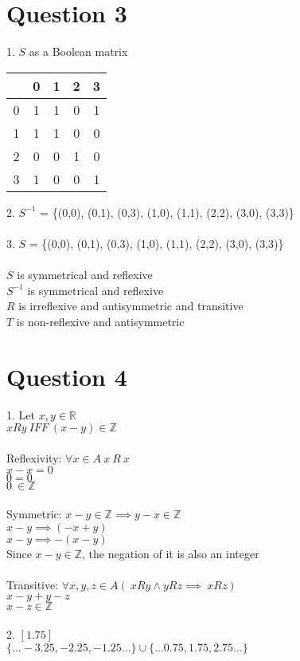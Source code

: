 \documentclass{article}
\begin{document}
    \section*{Question 3}
1. $S$ as a Boolean matrix \\
\begin{center}
\begin{tabular}{ |c|c|c|c|c| } 
 \hline
\ & 0 &1 & 2 & 3\\ \hline
0 & 1 &1 & 0 & 1\\ \hline
1 & 1 &1 & 0 & 0\\ \hline
2 & 0 & 0 & 1 & 0 \\  \hline
3 & 1 &0 & 0 & 1\\ \hline
\end{tabular}
\end{center} 
2. $S^{-1}$ =  \{(0,0), (0,1), (0,3), (1,0), (1,1), (2,2), (3,0), (3,3)\} \\ \\ 
3. $S$ =  \{(0,0), (0,1), (0,3), (1,0), (1,1), (2,2), (3,0), (3,3)\} \\ \\
\indent $S$ is symmetrical and reflexive \\
\indent $S^{-1}$ is symmetrical and reflexive \\
\indent $R$ is irreflexive and antisymmetric and transitive \\
\indent $T$ is non-reflexive and antisymmetric \\
    \newpage
    \section*{Question 4}
  1. 
   Let $x,y \in \mathbb{R} $ \\ 
   \indent
  $xRy \ IFF \ (x - y) \in \mathbb{Z}$ \\ \\
   \indent
  Reflexivity: $\forall x \in A \ x \ R \ x$ \\
   \indent
  \indent $x - x = 0$ \\ 
   \indent
  \indent $0 = 0$ \\
   \indent
  \indent $0 \ \in \mathbb{Z}$ \\ \\
   \indent
  Symmetric: $x - y \in \mathbb{Z} \implies y - x \in \mathbb{Z}$ \\
   \indent
  $x - y \implies (-x + y)$ \\
   \indent
  $x - y \implies -(x - y)$ \\
   \indent
  Since $x - y \in \mathbb{Z}$, the negation of it is also an integer \\ \\
   \indent
  Transitive: $\forall x,y,z \in A (\ x R y \land y R z \implies \ x R z)$ \\
   \indent
  $x - y + y - z$ \\
   \indent
  $x - z \in \mathbb{Z}$ \\ \\
  2. $[1.75]$ \\
  $\{...-3.25, -2.25, -1.25...\} \cup \{...0.75, 1.75, 2.75...\}$
    \newpage
\end{document}
